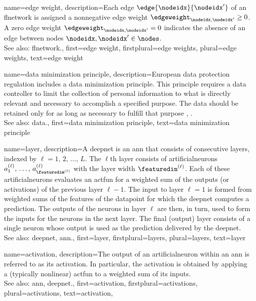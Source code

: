 {name={edge weight},
	description={Each edge $\edge{\nodeidx}{\nodeidx'}$ of an \gls{flnetwork} is 
		assigned a nonnegative edge weight $\edgeweight_{\nodeidx,\nodeidx'}\geq0$. 
		A zero edge weight $\edgeweight_{\nodeidx,\nodeidx'}=0$ indicates the absence 
		of an edge between nodes $\nodeidx, \nodeidx' \in \nodes$.
				\\
		See also: \gls{flnetwork}.}, 
	first={edge weight},
	firstplural={edge weights},
	plural={edge weights},
	text={edge weight}
}

{name={data minimization principle},
	description={European \gls{data} protection regulation 
		includes a \gls{data} minimization principle. This principle requires a \gls{data} controller to 
		limit the collection of personal information to what is directly relevant and necessary 
		to accomplish a specified purpose. The \gls{data} should be retained only for as long as 
		necessary to fulfill that purpose \cite[Article 5(1)(c)]{GDPR2016}, \cite{EURegulation2018}.
				\\
		See also: \gls{data}.}, 
	first={data minimization principle},
	text={data minimization principle}
}

{name={layer},
	description={A \gls{deepnet} is an \gls{ann} that consists of consecutive 
	    	layers, indexed by $\ell=1,\,2,\,\ldots,\,L$. The $\ell$th layer consists of 
		\glspl{artificialneuron} $a^{(\ell)}_{1},\,\ldots,\,a^{(\ell)}_{\featuredim^{(\ell)}}$ with 
		the layer width $\featuredim^{(\ell)}$. Each of these \glspl{artificialneuron} evaluates 
		an \gls{actfun} for a weighted sum of the \glspl{output} (or \glspl{activation}) of the 
		previous layer $\ell-1$. The input to layer $\ell=1$ is formed from weighted sums 
		of the \glspl{feature} of the \gls{datapoint} for which the \gls{deepnet} computes 
		a \gls{prediction}. The \glspl{output} of the \glspl{neuron} in layer $\ell$ are then, in turn, 
		used to form the inputs for the \glspl{neuron} in the next layer. The final (\gls{output}) layer 
		consists of a single \gls{neuron} whose 
		\gls{output} is used as the \gls{prediction} delivered by the \gls{deepnet}.  
		\\
		See also: \gls{deepnet}, \gls{ann}.}, 
	first={layer},
	firstplural={layers},
	plural={layers}, 
	text={layer}
}

{name={activation},
	description={The \gls{output} of an \gls{artificialneuron} within an \gls{ann} is referred 
		to as its activation. In particular, the activation is obtained by applying a (typically nonlinear) \gls{actfun} 
		to a weighted sum of its inputs.
		\\
		See also: \gls{ann}, \gls{deepnet}.}, 
	first={activation},
	firstplural={activations},
	plural={activations}, 
	text={activation}, 
}

